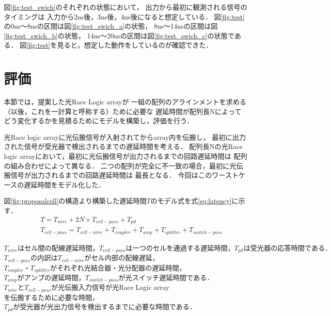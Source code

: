 図\ref{fig:test_swich}のそれぞれの状態において，
出力から最初に観測される信号のタイミングは
入力から2ns後，3ns後，4ns後になると想定している．
図\ref{fig:test}の0ns〜8nsの区間は図\ref{fig:test_swich_a}の状態，
8ns〜14nsの区間は図\ref{fig:test_swich_b}の状態，
14ns〜20nsの区間は図\ref{fig:test_swich_c}の状態である．
図\ref{fig:test}を見ると，想定した動作をしているのが確認できた．

\section{評価}
本節では，提案した光Race Logic arrayが
一組の配列のアラインメントを求める（以後，これを一計算と呼称する）ために必要な
遅延時間が配列長Nによってどう変化するかを見積るためにモデルを構築し，評価を行う．

光Race logic arrayに光伝搬信号が入射されてからarray内を伝搬し，
最初に出力された信号が受光器で検出されるまでの遅延時間を考える．
配列長Nの光Race logic arrayにおいて，最初に光伝搬信号が出力されるまでの回路遅延時間は
配列の組み合わせによって異なる．
二つの配列が完全に不一致の場合，最初に光伝搬信号が出力されるまでの回路遅延時間は
最長となる．
今回はこのワーストケースの遅延時間をモデル化した．

図\ref{fig:proposalcell}の構造より構築した遅延時間$T$のモデル式を式\ref{eq:latency}に示す．
\begin{eqnarray}
&&T = T_{wire}+2N \times T_{cell-pass}+T_{pd} \nonumber \\
&&T_{cell-pass} = T_{cell-wire}+T_{coupler}+T_{amp}+T_{splitter}+T_{switch-pass}
\label{eq:latency}
\end{eqnarray}

$T_{wire}はセル間の配線遅延時間，T_{cell-pass}は一つのセルを通過する遅延時間，T_{pd}は受光器の応答時間である．$
$T_{cell-pass}の内訳はT_{cell-wire}がセル内部の配線遅延，$
$T_{coupler}・T_{splitter}がそれぞれ光結合器・光分配器の遅延時間，$
$T_{amp}がアンプの遅延時間，T_{switch-pass}が光スイッチ遅延時間である．$
$T_{wire}とT_{cell-pass}が光伝搬入力信号が$光Race Logic array$を伝搬するために必要な時間，$
$T_{pd}が受光器が光出力信号を検出するまでに必要な時間である．$


